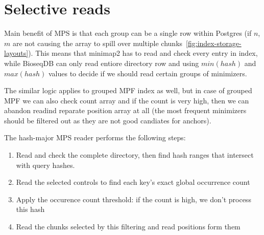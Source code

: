 \section{Selective reads}
\label{sec:index-cold-loading}
\label{sec:index-mps-selective-reads}

Main benefit of MPS is that each group can be a single row within Postgres
(if $n$, $m$ are not causing the array to spill over multiple chunks~\ref{fig:index-storage-layouts}).
This means that minimap2 has to read and check every entry in index, while BioseqDB can only read entiore directory row 
and using $min(hash)$ and $max(hash)$ values to decide if we should read certain groups of minimizers.

The similar logic applies to grouped MPF index as well, but in case of grouped MPF we can also check count array and if the count is very high, then 
we can abandon readind reparate position array at all (the most frequent minimizers should be filtered out as they are not good candiates for anchors). 

The hash-major MPS reader performs the following steps:
\begin{enumerate}
  \item Read and check the complete directory, then find hash ranges that intersect with query hashes.
  \item Read the selected controls to find each key's exact global occurrence count
  \item Apply the occurence count threshold: if the count is high, we don't process this hash
  \item Read the chunks selected by this filtering and read positions form them
\end{enumerate}

